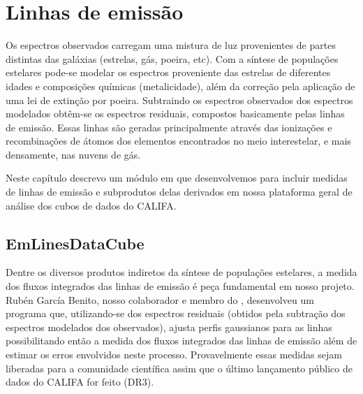 


\chapter{Linhas de emissão}
\label{sec:emlines}

Os espectros observados carregam uma mistura de luz provenientes de partes distintas das galáxias
(estrelas, gás, poeira, etc). Com a síntese de populações estelares pode-se modelar os espectros
proveniente das estrelas de diferentes idades e composições químicas (metalicidade), além da
correção pela aplicação de uma lei de extinção por poeira. Subtraindo os espectros observados dos
espectros modelados obtêm-se os espectros residuais, compostos basicamente pelas linhas de emissão.
Essas linhas são geradas principalmente através das ionizações e recombinações de átomos dos
elementos encontrados no meio interestelar, e mais densamente, nas nuvens de gás.

Neste capítulo descrevo um módulo em \pyt que desenvolvemos para incluir medidas de linhas de
emissão e subprodutos delas derivados em nossa plataforma geral de análise dos cubos de dados do
CALIFA.

\section{EmLinesDataCube}
\label{sec:emline:datacube}

Dentre os diversos produtos indiretos da síntese de populações estelares, a medida dos fluxos
integrados das linhas de emissão é peça fundamental em nosso projeto. Rubén García Benito, nosso
colaborador e membro do \PCAL, desenvolveu um programa que, utilizando-se dos espectros residuais
(obtidos pela subtração dos espectros modelados dos observados), ajusta perfis gaussianos para as
linhas possibilitando então a medida dos fluxos integrados das linhas de emissão além de estimar os
erros envolvidos neste processo. Provavelmente essas medidas sejam liberadas para a comunidade
científica assim que o último lançamento público de dados do CALIFA for feito (DR3).


